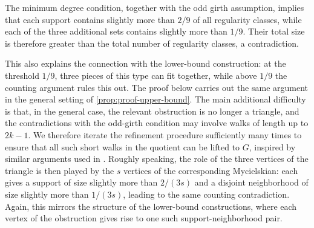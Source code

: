 \documentclass{article}
\begin{document}
The minimum degree condition, together with the odd girth assumption, implies that each support contains slightly more than $2/9$ of all regularity classes, while each of the three additional sets contains slightly more than $1/9$. Their total size is therefore greater than the total number of regularity classes, a contradiction.

This also explains the connection with the lower-bound construction: at the threshold $1/9$, three pieces of this type can fit together, while above $1/9$ the counting argument rules this out. The proof below carries out the same argument in the general setting of \cref{prop:proof-upper-bound}. The main additional difficulty is that, in the general case, the relevant obstruction is no longer a triangle, and the contradictions with the odd-girth condition may involve walks of length up to $2k-1$. We therefore iterate the refinement procedure sufficiently many times to ensure that all such short walks in the quotient can be lifted to $G$, inspired by similar arguments used in \cite{ES20}.
Roughly speaking, the role of the three vertices of the triangle is then played by the $s$ vertices of the corresponding Mycielskian: each gives a support of size slightly more than $2/(3s)$ and a disjoint neighborhood of size slightly more than $1/(3s)$, leading to the same counting contradiction. Again, this mirrors the structure of the lower-bound constructions, where each vertex of the obstruction gives rise to one such support-neighborhood pair.
\end{document}
